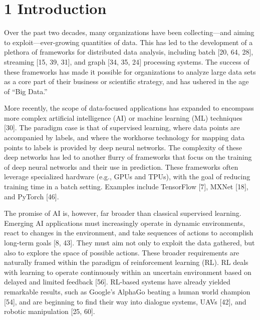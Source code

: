\documentclass[
]{article}
\begin{document}
\section{1 Introduction}\label{introduction}

Over the past two decades, many organizations have been collecting---and
aiming to exploit---ever-growing quantities of data. This has led to the
development of a plethora of frameworks for distributed data analysis,
including batch {[}20, 64, 28{]}, streaming {[}15, 39, 31{]}, and graph
{[}34, 35, 24{]} processing systems. The success of these frameworks has
made it possible for organizations to analyze large data sets as a core
part of their business or scientific strategy, and has ushered in the
age of ``Big Data.''

More recently, the scope of data-focused applications has expanded to
encompass more complex artificial intelligence (AI) or machine learning
(ML) techniques {[}30{]}. The paradigm case is that of supervised
learning, where data points are accompanied by labels, and where the
workhorse technology for mapping data points to labels is provided by
deep neural networks. The complexity of these deep networks has led to
another flurry of frameworks that focus on the training of deep neural
networks and their use in prediction. These frameworks often leverage
specialized hardware (e.g., GPUs and TPUs), with the goal of reducing
training time in a batch setting. Examples include TensorFlow {[}7{]},
MXNet {[}18{]}, and PyTorch {[}46{]}.

The promise of AI is, however, far broader than classical supervised
learning. Emerging AI applications must increasingly operate in dynamic
environments, react to changes in the environment, and take sequences of
actions to accomplish long-term goals {[}8, 43{]}. They must aim not
only to exploit the data gathered, but also to explore the space of
possible actions. These broader requirements are naturally framed within
the paradigm of reinforcement learning (RL). RL deals with learning to
operate continuously within an uncertain environment based on delayed
and limited feedback {[}56{]}. RL-based systems have already yielded
remarkable results, such as Google's AlphaGo beating a human world
champion {[}54{]}, and are beginning to find their way into dialogue
systems, UAVs {[}42{]}, and robotic manipulation {[}25, 60{]}.
\end{document}
